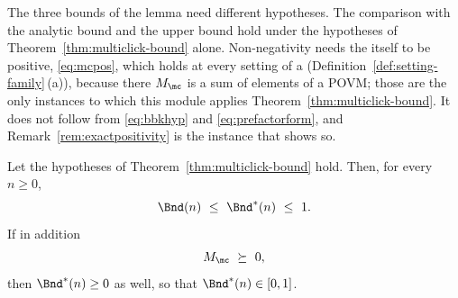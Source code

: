
The three bounds of the lemma need different hypotheses. The comparison with
the analytic bound and the upper bound hold under the hypotheses of
Theorem~\ref{thm:multiclick-bound} alone. Non-negativity needs the
 itself to be positive, \eqref{eq:mcpos}, which holds at every setting
of a  (Definition~\ref{def:setting-family}\,(a)), because
there $M_{\mc}$ is a sum of elements of a POVM; those are the only instances
to which this module applies Theorem~\ref{thm:multiclick-bound}. It does not follow
from \eqref{eq:bbkhyp} and \eqref{eq:prefactorform}, and
Remark~\ref{rem:exactpositivity} is the instance that shows so.

\begin{lemma}
\label{lem:exactbasic}
Let the hypotheses of Theorem~\ref{thm:multiclick-bound} hold. Then, for every
$n\ge0$,
\begin{equation}\label{eq:exactbasic}
  \Bnd(n)\ \le\ \Bnd^{\ast}(n)\ \le\ 1 .
\end{equation}
If in addition
\begin{equation}\label{eq:mcpos}
  M_{\mc}\ \succeq\ 0 ,
\end{equation}
then $\Bnd^{\ast}(n)\ge0$ as well, so that $\Bnd^{\ast}(n)\in[0,1]$.
\end{lemma}

